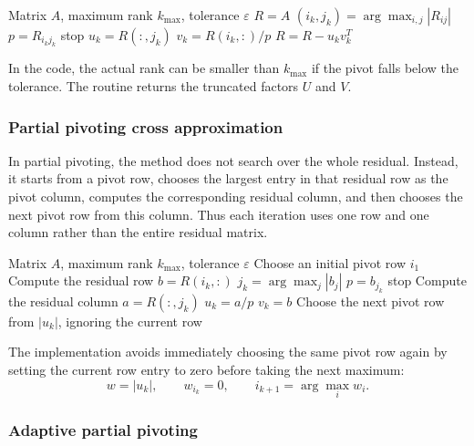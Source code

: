 \begin{algorithmic}[1]
    \Require Matrix $A$, maximum rank $k_{\max}$, tolerance $\varepsilon$
    \State $R = A$
        \State $(i_k,j_k) = \arg\max_{i,j} |R_{ij}|$
        \State $p = R_{i_k j_k}$
            \State stop
        \EndIf
        \State $u_k = R(:,j_k)$
        \State $v_k = R(i_k,:)/p$
        \State $R = R - u_k v_k^T$
    \EndFor
\end{algorithmic}

In the code, the actual rank can be smaller than $k_{\max}$ if the pivot falls below the tolerance. The routine returns the truncated factors $U$ and $V$.

\subsubsection*{Partial pivoting cross approximation}

In partial pivoting, the method does not search over the whole residual. Instead, it starts from a pivot row, chooses the largest entry in that residual row as the pivot column, computes the corresponding residual column, and then chooses the next pivot row from this column. Thus each iteration uses one row and one column rather than the entire residual matrix.

\begin{algorithmic}[1]
    \Require Matrix $A$, maximum rank $k_{\max}$, tolerance $\varepsilon$
    \State Choose an initial pivot row $i_1$
        \State Compute the residual row $b = R(i_k,:)$
        \State $j_k = \arg\max_j |b_j|$
        \State $p = b_{j_k}$
            \State stop
        \EndIf
        \State Compute the residual column $a = R(:,j_k)$
        \State $u_k = a/p$
        \State $v_k = b$
        \State Choose the next pivot row from $|u_k|$, ignoring the current row
    \EndFor
\end{algorithmic}

The implementation avoids immediately choosing the same pivot row again by setting the current row entry to zero before taking the next maximum:
\[
  w = |u_k|, \qquad w_{i_k}=0, \qquad i_{k+1}=\arg\max_i w_i .
\]

\subsubsection*{Adaptive partial pivoting}

